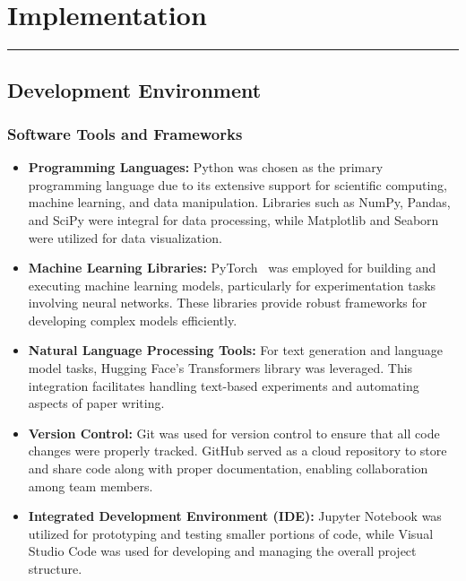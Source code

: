 \chapter{Implementation}
\vspace{-1.5cm}
\hspace{-1cm}\rule{19cm}{0.4pt} 

\section{Development Environment}
\subsection{Software Tools and Frameworks}
\begin{itemize}
    \item \textbf{Programming Languages:} Python was chosen as the primary programming language due to its extensive support for scientific computing, machine learning, and data manipulation. Libraries such as NumPy, Pandas, and SciPy were integral for data processing, while Matplotlib and Seaborn were utilized for data visualization.
    
    \item \textbf{Machine Learning Libraries:} PyTorch~\cite{Paszke2019PyTorch} was employed for building and executing machine learning models, particularly for experimentation tasks involving neural networks. These libraries provide robust frameworks for developing complex models efficiently.
    
    \item \textbf{Natural Language Processing Tools:} For text generation and language model tasks, Hugging Face's Transformers library was leveraged. This integration facilitates handling text-based experiments and automating aspects of paper writing.
    
    \item \textbf{Version Control:} Git was used for version control to ensure that all code changes were properly tracked. GitHub served as a cloud repository to store and share code along with proper documentation, enabling collaboration among team members.
    
    \item \textbf{Integrated Development Environment (IDE):} Jupyter Notebook was utilized for prototyping and testing smaller portions of code, while Visual Studio Code was used for developing and managing the overall project structure.
\end{itemize}

